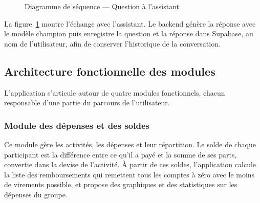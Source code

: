 \begin{figure}[H]
\centering
{}
\caption{Diagramme de séquence --- Question à l'assistant}
\label{fig:seq_chat}
\end{figure}

La figure~\ref{fig:seq_chat} montre l'échange avec l'assistant. Le backend génère la réponse
avec le modèle champion puis enregistre la question et la réponse dans Supabase, au nom de
l'utilisateur, afin de conserver l'historique de la conversation.

\subsection{Architecture fonctionnelle des modules}

L'application s'articule autour de quatre modules fonctionnels, chacun responsable d'une
partie du parcours de l'utilisateur.

\subsubsection{Module des dépenses et des soldes}

Ce module gère les activités, les dépenses et leur répartition. Le solde de chaque
participant est la différence entre ce qu'il a payé et la somme de ses parts, convertie
dans la devise de l'activité. À partir de ces soldes, l'application calcule la liste des
remboursements qui remettent tous les comptes à zéro avec le moins de virements possible,
et propose des graphiques et des statistiques sur les dépenses du groupe.

